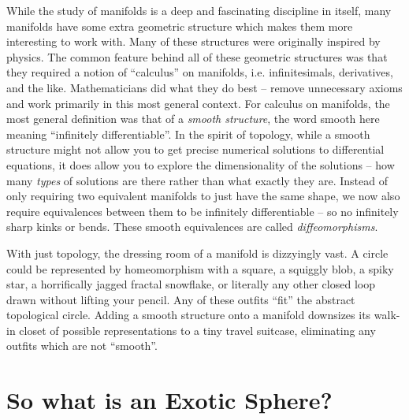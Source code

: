 While the study of manifolds is a deep and fascinating discipline in itself, many manifolds have some extra geometric structure which makes them more interesting to work with. Many of these structures were originally inspired by physics.
The common feature behind all of these geometric structures was that they required a notion of ``calculus'' on manifolds, i.e. infinitesimals, derivatives, and the like. Mathematicians did what they do best -- remove unnecessary axioms and work primarily in this most general context. For calculus on manifolds, the most general definition was that of a \emph{smooth structure}, the word smooth here meaning ``infinitely differentiable''. In the spirit of topology, while a smooth structure might not allow you to get precise numerical solutions to differential equations, it does allow you to explore the dimensionality of the solutions -- how many \emph{types} of solutions are there rather than what exactly they are. Instead of only requiring two equivalent manifolds to just have the same shape, we now also require equivalences between them to be infinitely differentiable -- so no infinitely sharp kinks or bends. These smooth equivalences are called \emph{diffeomorphisms}.

With just topology, the dressing room of a manifold is dizzyingly vast.
A circle could be represented by homeomorphism with a square, a squiggly blob, a spiky star, a horrifically jagged fractal snowflake, or literally any other closed loop drawn without lifting your pencil. Any of these outfits ``fit'' the abstract topological circle.
Adding a smooth structure onto a manifold downsizes its walk-in closet of possible representations to a tiny travel suitcase, eliminating any outfits which are not ``smooth''.

\section*{So what is an Exotic Sphere?}

